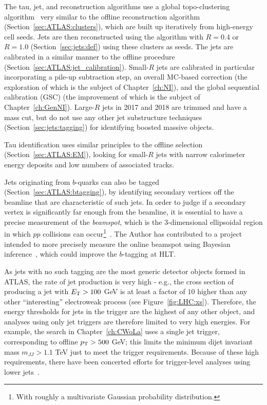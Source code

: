 The tau, jet, and \etmiss{} reconstruction algorithms use a global topo-clustering algorithm~\cite{Aad:2016upy} very similar to the offline reconstruction algorithm (Section~\ref{sec:ATLAS:clusters}), which are built up iteratively from high-energy cell seeds.
Jets are then reconstructed using the \antikt{} algorithm with $R=0.4$ or $R=1.0$ (Section~\ref{sec:jets:def}) using these clusters as seeds.
The jets are calibrated in a similar manner to the offline procedure (Section~\ref{sec:ATLAS:jet_calibration}).
Small-$R$ jets are calibrated in particular incorporating a pile-up subtraction step, an overall MC-based \pt{} correction (the exploration of which is the subject of Chapter~\ref{ch:NI}), and the global sequential calibration (GSC) (the improvement of which is the subject of Chapter~\ref{ch:GenNI}).
Large-$R$ jets in 2017 and 2018 are trimmed and have a mass cut, but do not use any other jet substructure techniques (Section~\ref{sec:jets:tagging}) for identifying boosted massive objects.

Tau identification uses similar principles to the offline selection (Section~\ref{sec:ATLAS:EM}), looking for small-$R$ jets with narrow calorimeter energy deposits and low numbers of associated tracks.

Jets originating from $b$-quarks can also be tagged (Section~\ref{sec:ATLAS:btagging}), by identifying secondary vertices off the beamline that are characteristic of such jets.
In order to judge if a secondary vertex is significantly far enough from the beamline, it is essential to have a precise measurement of the \textit{beamspot}, which is the 3-dimensional ellipsoidal region in which $pp$ collisions can occur\footnote{With roughly a multivariate Gaussian probability distribution.}~\cite{ATLAS-CONF-2010-027}.
The Author has contributed to a project intended to more precisely measure the online beamspot using Bayesian inference~\cite{beamspot}, which could improve the $b$-tagging at HLT.

As jets with no such tagging are the most generic detector objects formed in ATLAS, the rate of jet production is very high - e.g., the cross section of producing a jet with $E_{\text{T}}>100$ GeV is at least a factor of $10$ higher than any other ``interesting'' electroweak process (see Figure~\ref{fig:LHC:xs}).
Therefore, the energy thresholds for jets in the trigger are the highest of any other object, and analyses using only jet triggers are therefore limited to very high energies.
For example, the search in Chapter~\ref{ch:CWoLa} uses a single jet trigger, corresponding to offline $p_{\text{T}}>500$ GeV; this limits the minimum dijet invariant mass $m_{JJ}>1.1$ TeV just to meet the trigger requirements.
Because of these high requirements, there have been concerted efforts for trigger-level analyses using lower \pt{} jets~\cite{Aaboud:2018fzt}.


